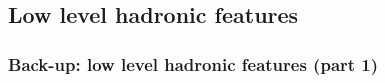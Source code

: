 \documentclass[xcolor=table,8pt]{beamer}
\begin{document}
    \subsection{Low level hadronic features}
    \begin{frame}[t]
        \frametitle{Back-up: low level hadronic features (part 1)}
    
        \begin{figure}[!h]
            \begin{minipage}[c]{0.25\linewidth}
                \vspace{0pt}
                \centering
            \end{minipage}%
            \begin{minipage}[c]{0.25\linewidth}
                \vspace{0pt}
                \centering
\end{minipage}
\end{figure}
\end{frame}
\end{document}
